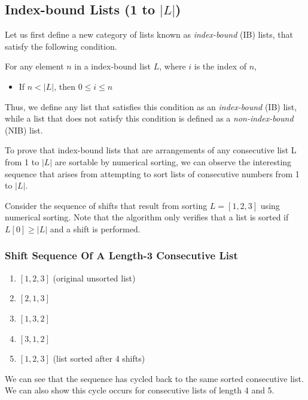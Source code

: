 \documentclass[12pt]{article}
\begin{document}
\subsection{Index-bound Lists (1 to $|L|$)}
Let us first define a new category of lists known as \emph{index-bound} (IB) lists, that satisfy the following condition.

For any element $n$ in a index-bound list $L$, where $i$ is the index of $n$,
\begin{itemize}
    \item If $n < |L|$, then $0 \leq i \leq n$
\end{itemize}

Thus, we define any list that satisfies this condition as an \emph{index-bound} (IB) list, while a list that does not satisfy this condition is defined as a \emph{non-index-bound} (NIB) list.

To prove that index-bound lists that are arrangements of any consecutive list L from 1 to $|L|$ are sortable by numerical sorting, we can observe the interesting sequence that arises from attempting to sort lists of consecutive numbers from 1 to $|L|$.

Consider the sequence of shifts that result from sorting $L = [1,2,3]$ using numerical sorting. Note that the algorithm only verifies that a list is sorted if $L[0] \geq |L|$ and a shift is performed.

\subsubsection{Shift Sequence Of A Length-3 Consecutive List}
\begin{enumerate}[start=0]
    \item $[1, 2, 3]$ (original unsorted list)
    \item $[2, 1, 3]$
    \item $[1, 3, 2]$
    \item $[3, 1, 2]$
    \item $[1, 2, 3]$ (list sorted after 4 shifts)
\end{enumerate}

We can see that the sequence has cycled back to the same sorted consecutive list. We can also show this cycle occurs for consecutive lists of length 4 and 5.
\end{document}
